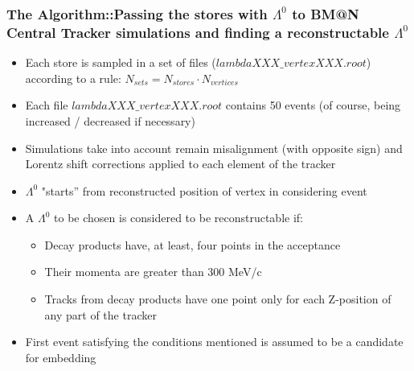 \documentclass[dvipsnames] {beamer}
\begin{document}
        \begin{frame}
          \frametitle{\bf \centering \tiny The Algorithm::Passing the stores with $\Lambda^{0}$ to BM@N Central Tracker simulations and finding a reconstructable $\Lambda^{0}$}
          \footnotesize
          \begin{itemize}
            \bf
          \item Each store is sampled in a set of files ($lambdaXXX\_vertexXXX.root$) according to a rule:
            $N_{sets} = N_{stores} \cdot N_{vertices}$
          \item Each file $lambdaXXX\_vertexXXX.root$ contains 50 events (of course, being increased  / decreased if necessary)
          \item Simulations take into account remain misalignment (with opposite sign) and Lorentz shift corrections applied to each element
            of the tracker
          \item $\Lambda^{0}$ "starts'' from reconstructed position of vertex in considering event 
          \item A $\Lambda^{0}$ to be chosen is considered to be reconstructable if:
             \footnotesize
            \begin{itemize}
            \item Decay products have, at least, four points in the acceptance
            \item Their momenta are greater than 300 MeV/c
            \item Tracks from decay products have one point only for each Z-position of any part of the tracker
            \end{itemize}
          \item First event satisfying the conditions mentioned is assumed to be a candidate for embedding 
          \end{itemize}
        \end{frame}
\end{document}
